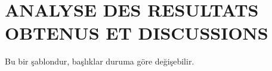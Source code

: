 \chapter{ANALYSE DES RESULTATS OBTENUS ET DISCUSSIONS}
\thispagestyle{empty}

Bu bir şablondur, başlıklar duruma göre değişebilir.


\lipsum[1-5]
